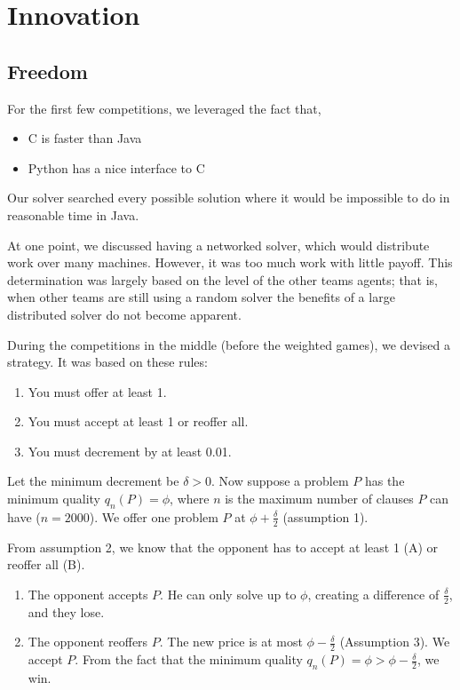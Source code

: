 \documentclass[letterpaper,12pt,oneside]{article}
\begin{document}
\section{Innovation}

\setcounter{subsection}{-1}
\subsection{Freedom}

For the first few competitions, we leveraged the fact that,
\begin{itemize}
\item C is faster than Java
\item Python has a nice interface to C
\end{itemize}
Our solver searched every possible solution where it would be impossible to
do in reasonable time in Java.

At one point, we discussed having a networked solver, which would
distribute work over many machines. However, it was too much work with
little payoff. This determination was largely based on the level of the other teams agents; that is, when other teams are still using a random solver the benefits of a large distributed solver do not become apparent.

During the competitions in the middle (before the weighted games), we
devised a strategy. It was based on these rules:
\begin{enumerate}
\item You must offer at least 1.
\item You must accept at least 1 or reoffer all.
\item You must decrement by at least 0.01.
\end{enumerate}

Let the minimum decrement be $\delta > 0$.
Now suppose a problem $P$ has the minimum quality $q_n(P) = \phi$, where $n$
is the maximum number of clauses $P$ can have ($n = 2000$).
We offer one problem $P$ at $\phi + \frac{\delta}{2}$ (assumption 1).

From assumption 2, we know that the opponent has to accept at least 1 (A)
or reoffer all (B).

\begin{enumerate}
\renewcommand{\labelenumi}{(\Alph{enumi})}
    \item The opponent accepts $P$. He can only solve up to $\phi$,
          creating a difference of $\frac{\delta}{2}$, and they lose.
    \item The opponent reoffers $P$. The new price is at most $\phi -
          \frac{\delta}{2}$ (Assumption 3). We accept $P$. From
          the fact that the minimum quality $q_n(P) = \phi > \phi -
          \frac{\delta}{2}$, we win.
\end{enumerate}
\end{document}
